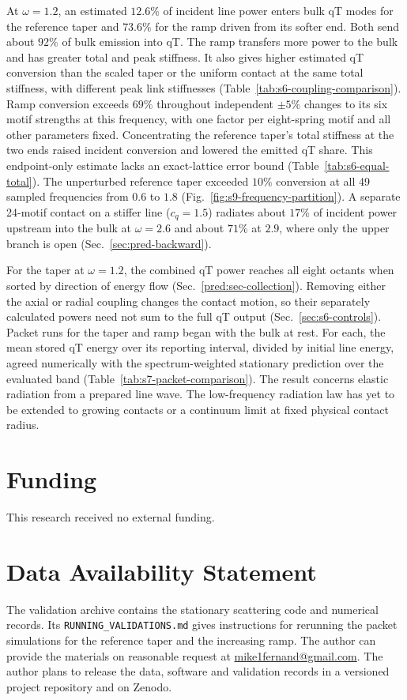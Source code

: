 \documentclass[10pt,aps,onecolumn,floatfix,notitlepage,nofootinbib,showkeys]{revtex4-2}
\begin{document}
At $\omega=1.2$, an estimated $12.6\%$ of incident line power enters bulk qT modes for the reference taper and $73.6\%$ for the ramp driven from its softer end. Both send about $92\%$ of bulk emission into qT. The ramp transfers more power to the bulk and has greater total and peak stiffness. It also gives higher estimated qT conversion than the scaled taper or the uniform contact at the same total stiffness, with different peak link stiffnesses (Table~\ref{tab:s6-coupling-comparison}). Ramp conversion exceeds $69\%$ throughout independent $\pm5\%$ changes to its six motif strengths at this frequency, with one factor per eight-spring motif and all other parameters fixed. Concentrating the reference taper's total stiffness at the two ends raised incident conversion and lowered the emitted qT share. This endpoint-only estimate lacks an exact-lattice error bound (Table~\ref{tab:s6-equal-total}). The unperturbed reference taper exceeded $10\%$ conversion at all 49 sampled frequencies from $0.6$ to $1.8$ (Fig.~\ref{fig:s9-frequency-partition}). A separate 24-motif contact on a stiffer line ($c_q=1.5$) radiates about $17\%$ of incident power upstream into the bulk at $\omega=2.6$ and about $71\%$ at $2.9$, where only the upper branch is open (Sec.~\ref{sec:pred-backward}).

For the taper at $\omega=1.2$, the combined qT power reaches all eight octants when sorted by direction of energy flow (Sec.~\ref{pred:sec-collection}). Removing either the axial or radial coupling changes the contact motion, so their separately calculated powers need not sum to the full qT output (Sec.~\ref{sec:s6-controls}). Packet runs for the taper and ramp began with the bulk at rest. For each, the mean stored qT energy over its reporting interval, divided by initial line energy, agreed numerically with the spectrum-weighted stationary prediction over the evaluated band (Table~\ref{tab:s7-packet-comparison}). The result concerns elastic radiation from a prepared line wave. The low-frequency radiation law has yet to be extended to growing contacts or a continuum limit at fixed physical contact radius.

\section*{Funding}
This research received no external funding.

\section*{Data Availability Statement}
The validation archive contains the stationary scattering code and numerical records. Its \nolinkurl{RUNNING_VALIDATIONS.md} gives instructions for rerunning the packet simulations for the reference taper and the increasing ramp. The author can provide the materials on reasonable request at \href{mailto:mike1fernand@gmail.com}{mike1fernand@gmail.com}. The author plans to release the data, software and validation records in a versioned project repository and on Zenodo.
\end{document}
